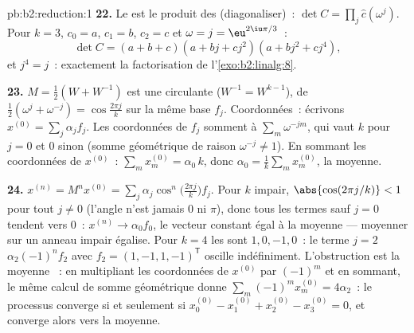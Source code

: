 \begin{solution}{pb:b2:reduction:1}
\textbf{22.} Le  est le produit des 
(diagonaliser)~: $\det C = \prod_{j}\widehat c(\omega^j)$. Pour $k =
3$, $c_0 = a$, $c_1 = b$, $c_2 = c$ et $\omega = j =
\eu^{2\iu\pi/3}$~:
\[
\det C = (a + b + c)(a + bj + cj^2)(a + bj^2 + cj^4),
\]
et $j^4 = j$~: exactement la factorisation de
l'\cref{exo:b2:linalg:8}.

\textbf{23.} $M = \frac12(W + W^{-1})$ est une circulante ($W^{-1} =
W^{k-1}$), de  $\frac12(\omega^j + \omega^{-j}) =
\cos\frac{2\pi j}k$ sur la même base $f_j$. Coordonnées~: écrivons
$x^{(0)} = \sum_j \alpha_j f_j$. Les coordonnées de $f_j$ somment à
$\sum_m \omega^{-jm}$, qui vaut $k$ pour $j = 0$ et $0$ sinon (somme
géométrique de raison $\omega^{-j} \neq 1$). En sommant les
coordonnées de $x^{(0)}$~: $\sum_m x^{(0)}_m = \alpha_0\,k$, donc
$\alpha_0 = \frac1k\sum_m x^{(0)}_m$, la moyenne.

\textbf{24.} $x^{(n)} = M^nx^{(0)} = \sum_j
\alpha_j\cos^n\bigl(\tfrac{2\pi j}k\bigr)f_j$. Pour $k$ impair,
$\abs{\cos(2\pi j/k)} < 1$ pour tout $j \neq 0$ (l'angle n'est jamais
$0$ ni $\pi$), donc tous les termes sauf $j = 0$ tendent vers $0$~:
$x^{(n)} \to \alpha_0 f_0$, le vecteur constant égal à la moyenne ---
moyenner sur un anneau impair égalise. Pour $k = 4$ les  sont $1, 0, -1, 0$~: le terme $j = 2$ $\alpha_2(-1)^nf_2$ avec
$f_2 = (1, -1, 1, -1)^{\mathsf T}$ oscille indéfiniment. L'obstruction
est la moyenne ~: en multipliant les coordonnées de $x^{(0)}$
par $(-1)^m$ et en sommant, le même calcul de somme géométrique donne
$\sum_m (-1)^mx^{(0)}_m = 4\alpha_2$~: le processus converge si et
seulement si $x^{(0)}_0 - x^{(0)}_1 + x^{(0)}_2 - x^{(0)}_3 = 0$, et
converge alors vers la moyenne.


\end{solution}
